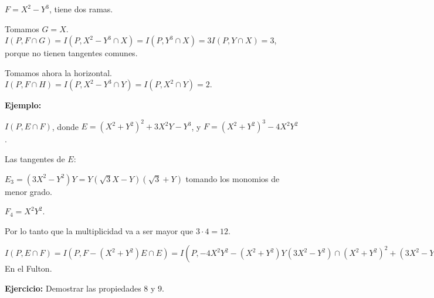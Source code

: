 $F=X^2-Y^3$, tiene dos ramas. 

Tomamos $G=X$. $I(P,F\cap G)=I(P,X^2-Y^3\cap X)=I(P,Y^3\cap X)=3I(P,Y\cap X)=3$, porque no tienen tangentes comunes. 

Tomamos ahora la horizontal. $I(P,F\cap H)=I(P,X^2-Y^3\cap Y)=I(P,X^2\cap Y)=2$.

\textbf{Ejemplo: }

$I(P,E\cap F)$, donde $E=(X^2+Y^2)^2+3X^2Y-Y^3$, y $F=(X^2+Y^2)^3-4X^2Y^2$. 

Las tangentes de $E$:

$E_3=(3X^2-Y^2)Y=Y(\sqrt{3}X-Y)(\sqrt{3}+Y)$ tomando los monomios de menor grado.

$F_4=X^2Y^2$. 

Por lo tanto que la multiplicidad va a ser mayor que $3\cdot 4=12$. 

$I(P,E\cap F)=I(P,F-(X^2+Y^2)E\cap E)=I(P,-4X^2Y^2-(X^2+Y^2)Y(3X^2-Y^2)\cap (X^2+Y^2)^2+(3X^2-Y^2)Y)=I(P,Y(-4X^2Y-(X^2+Y^2)(3X^2-Y^2)\cap E)=I(P,Y\cap (X^2+Y^2)^2+(3X^2-Y^2)Y)+I(P,H_3\cap H_2)=I(P,Y\cap X^4)+3\cdot 2 = ...$ En el Fulton. 

\textbf{Ejercicio:} Demostrar las propiedades 8 y 9. 

